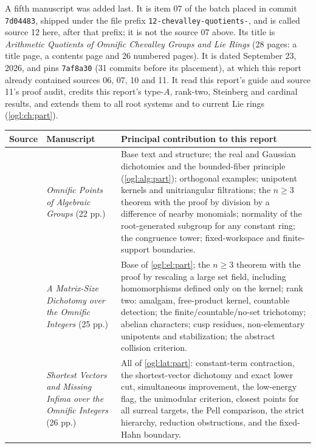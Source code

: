 \documentclass[11pt,oneside]{article}
\numberwithin{equation}{section}
\theoremstyle{definition}
\theoremstyle{remark}
\newcommand{\fn}[1]{\nolinkurl{#1}}
\begin{document}
A fifth manuscript was added last. It is item 07 of the batch placed in commit
\texttt{7d04483}, shipped under the file prefix \fn{12-chevalley-quotients-},
and is called source 12 here, after that prefix; it is not the source 07 above.
Its title is \emph{Arithmetic Quotients of Omnific Chevalley Groups and Lie
Rings} (28 pages: a title page, a contents page and 26 numbered pages). It is
dated September 23, 2026, and pins \texttt{7af8a30} (31 commits before its
placement), at which this report already contained sources 06, 07, 10 and 11.
It read this report's guide and source 11's proof audit, credits this report's
type-$A$, rank-two, Steinberg and cardinal results, and extends them to all
root systems and to current Lie rings (\cref{ogl:ch:part}).

\begin{center}
\renewcommand{\arraystretch}{1.2}
\begin{tabular}{>{\raggedright\arraybackslash}p{}>{\raggedright\arraybackslash}p{}>{\raggedright\arraybackslash}p{}}
\toprule
Source & Manuscript & Principal contribution to this report\\
\midrule
06 & \emph{Omnific Points of Algebraic Groups} (22 pp.) &
Base text and structure; the real and Gaussian dichotomies and the
bounded-fiber principle (\cref{ogl:alg:part}); orthogonal examples; unipotent
kernels and unitriangular filtrations; the $n\ge3$ theorem with the proof by
division by a difference of nearby monomials; normality of the root-generated
subgroup for any constant ring; the congruence tower; fixed-workspace and
finite-support boundaries.\\
07 & \emph{A Matrix-Size Dichotomy over the Omnific Integers} (25 pp.) &
Base of \cref{ogl:el:part}; the $n\ge3$ theorem with the proof by rescaling a
large set field, including homomorphisms defined only on the kernel; rank
two: amalgam, free-product kernel, countable detection; the
finite/countable/no-set trichotomy; abelian characters; cusp residues,
non-elementary unipotents and stabilization; the abstract collision
criterion.\\
10 & \emph{Shortest Vectors and Missing Infima over the Omnific Integers} (26 pp.) &
All of \cref{ogl:lat:part}: constant-term contraction, the shortest-vector
dichotomy and exact lower cut, simultaneous improvement, the low-energy flag,
the unimodular criterion, closest points for all surreal targets, the Pell
comparison, the strict hierarchy, reduction obstructions, and the fixed-Hahn
boundary.\\

\end{tabular}
\end{center}
\end{document}
